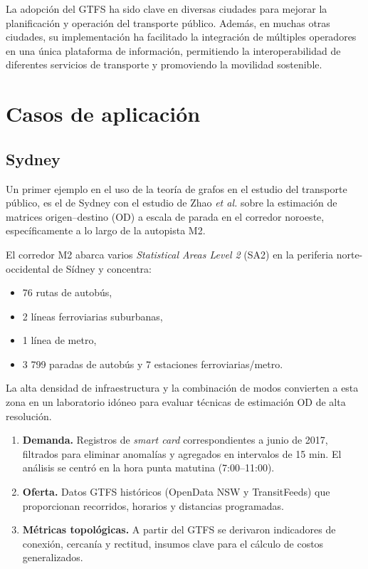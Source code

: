 \documentclass[openany]{book}
\begin{document}
		La adopción del GTFS ha sido clave en diversas ciudades para mejorar la planificación y operación del transporte público. Además, en muchas otras ciudades, su implementación ha facilitado la integración de múltiples operadores en una única plataforma de información, permitiendo la interoperabilidad de diferentes servicios de transporte y promoviendo la movilidad sostenible.

	\section{Casos de aplicación}
		\subsection{Sydney}
		\label{sec:sydney}

		Un primer ejemplo en el uso de la teoría de grafos en el estudio del transporte público, es el de Sydney con el estudio de Zhao \textit{et al.} sobre la estimación de matrices origen–destino (OD) a escala de parada en el corredor noroeste, específicamente a lo largo de la autopista M2.

		El corredor M2 abarca varios \textit{Statistical Areas Level 2} (SA2) en la periferia norte-occidental de Sídney y concentra:
		\begin{itemize}
		  \item 76 rutas de autobús,
		  \item 2 líneas ferroviarias suburbanas,
		  \item 1 línea de metro,
		  \item 3 799 paradas de autobús y 7 estaciones ferroviarias/metro.
		\end{itemize}
		La alta densidad de infraestructura y la combinación de modos convierten a esta zona en un laboratorio idóneo para evaluar técnicas de estimación OD de alta resolución.

		\begin{enumerate}
		  \item \textbf{Demanda.} Registros de \emph{smart card} correspondientes a junio de 2017, filtrados para eliminar anomalías y agregados en intervalos de 15 min. El análisis se centró en la hora punta matutina (7:00–11:00).
		  \item \textbf{Oferta.} Datos GTFS históricos (OpenData NSW y TransitFeeds) que proporcionan recorridos, horarios y distancias programadas.
		  \item \textbf{Métricas topológicas.} A partir del GTFS se derivaron indicadores de conexión, cercanía y rectitud, insumos clave para el cálculo de costos generalizados.
		\end{enumerate}
\end{document}
